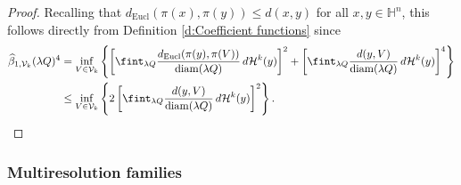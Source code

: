\documentclass[12pt]{amsart}
\newcommand{\diam}{{\rm diam}}
\numberwithin{equation}{section}
\theoremstyle{plain}
\theoremstyle{definition}
\theoremstyle{remark}
\begin{document}
\begin{proof}
Recalling that $d_{\mathrm{Eucl}}(\pi(x),\pi(y))\leq d(x,y)$ for all $x,y\in \mathbb{H}^n$, this follows directly from Definition \ref{d:Coefficient functions} since
\begin{align*}
    \widehat{\beta}_{1,\mathcal{V}_k}(\lambda Q)^4&=\inf_{V\in\mathcal V_k}\left\{\left[\fint_{\lambda Q}\frac{d_{\mathrm{Eucl}}(\pi(y),\pi(V))}{\diam (\lambda Q)}\,d\mathcal{H}^k(y)\right]^{2}+\left[\fint_{\lambda Q}\frac{d(y,V)}{\diam (\lambda Q)}\,d\mathcal{H}^k(y)\right]^{4}\right\}\\
   & \leq \inf_{V\in\mathcal V_k}\left\{2\left[\fint_{\lambda Q}\frac{d(y,V)}{\diam (\lambda Q)}\,d\mathcal{H}^k(y)\right]^{2}\right\}.\qedhere
\end{align*}
\end{proof}


\subsubsection{Multiresolution families}
\end{document}
